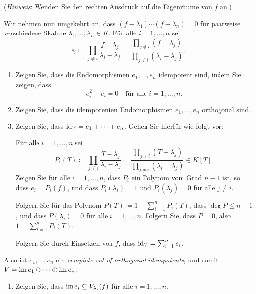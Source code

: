 \begin{question}
\begin{enumerate}[resume]
      (\emph{Hinweis}:
       Wenden Sie den rechten Ausdruck auf die Eigenräume von $f$ an.)
  \end{enumerate}
  Wir nehmen nun umgekehrt an, dass $(f - \lambda_1) \dotsm (f - \lambda_n) = 0$ für paarweise verschiedene Skalare $\lambda_1, \dotsc, \lambda_n \in K$.
  Für alle $i = 1, \dotsc, n$ sei
  \[
              e_i
    \coloneqq \prod_{j \neq i} \frac{f - \lambda_j}{\lambda_i - \lambda_j}
    =         \frac{\prod_{j \neq i} (f-\lambda_j)}{\prod_{j \neq i} (\lambda_i - \lambda_j)}.
  \]
  \begin{enumerate}[resume]
    \item
      Zeigen Sie, dass die Endomorphismen $e_1, \dotsc, e_n$ idempotent sind, indem Sie zeigen, dass
      \[
        e_i^2 - e_i = 0
        \quad
        \text{für alle $i = 1, \dotsc, n$}.
      \]
    \item
      Zeigen Sie, dass die idempotenten Endomorphismen $e_1, \dotsc, e_n$ orthogonal sind.
    \item
      Zeigen Sie, dass $\operatorname{id}_V = e_1 + \dotsb + e_n$.
      Gehen Sie hierfür wie folgt vor:
      
      Für alle $i = 1, \dotsc, n$ sei
      \[
                  P_i(T)
        \coloneqq \prod_{j \neq i} \frac{T - \lambda_j}{\lambda_i - \lambda_j}
        =         \frac{\prod_{j \neq i} (T-\lambda_j)}{\prod_{j \neq i} (\lambda_i - \lambda_j)}
        \in K[T].
      \]
      Zeigen Sie für alle $i = 1, \dotsc, n$, dass $P_i$ ein Polynom vom Grad $n-1$ ist, so dass $e_i = P_i(f)$, und dass $P_i(\lambda_i) = 1$ und $P_i(\lambda_j) = 0$ für alle $j \neq i$.
      
      Folgern Sie für das Polynom $P(T) \coloneqq 1 - \sum_{i=1}^n P_i(T)$, dass $\deg P \leq n-1$, und dass $P(\lambda_i) = 0$ für alle $i = 1, \dotsc, n$.
      Folgern Sie, dass $P = 0$, also $1 = \sum_{i=1}^n P_i(T)$.
      
      Folgern Sie durch Einsetzen von $f$, dass $\operatorname{id}_V = \sum_{i=1}^n e_i$.
  \end{enumerate}
  Also ist $e_1, \dotsc, e_n$ ein \emph{complete set of orthogonal idempotents}, und somit $V = \operatorname{im} e_1 \oplus \dotsb \oplus \operatorname{im} e_n$.
  \begin{enumerate}[resume]
    \item
      Zeigen Sie, dass $\operatorname{im} e_i \subseteq V_{\lambda_i}(f)$ für alle $i = 1, \dotsc, n$.
      

\end{enumerate}
\end{question}
